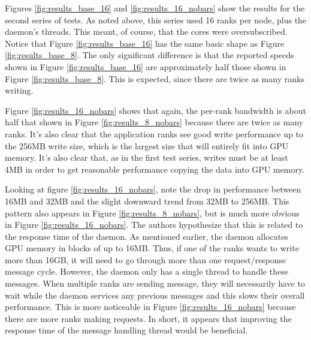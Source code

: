 
Figures \ref{fig:results_base_16} and \ref{fig:results_16_nobars} show the results for the second series of tests.  As noted above, this series used 16 ranks per node, plus the daemon's threads.  This meant, of course, that the cores were oversubscribed.  Notice that Figure \ref{fig:results_base_16} has the same basic shape as Figure \ref{fig:results_base_8}.  The only significant difference is that the reported speeds shown in Figure \ref{fig:results_base_16} are approximately half those shown in Figure \ref{fig:results_base_8}.  This is expected, since there are twice as many ranks writing.

Figure \ref{fig:results_16_nobars} shows that again, the per-rank bandwidth is about half that shown in Figure \ref{fig:results_8_nobars} because there are twice as many ranks.  It's also clear that the application ranks see good write performance up to the 256MB write size, which is the largest size that will entirely fit into GPU memory.  It's also clear that, as in the first test series, writes must be at least 4MB in order to get reasonable performance copying the data into GPU memory.


Looking at figure \ref{fig:results_16_nobars}, note the drop in performance between 16MB and 32MB and the slight downward trend from 32MB to 256MB.  This pattern also appears in Figure \ref{fig:results_8_nobars}, but is much more obvious in Figure 
\ref{fig:results_16_nobars}.  The authors hypothesize that this is related to the response time of the daemon.  As mentioned earlier, the daemon allocates GPU memory in blocks of up to 16MB.  Thus, if one of the ranks wants to write more than 16GB, it will need to go through more than one request/response message cycle.  However, the daemon only has a single thread to handle these messages.  When multiple ranks are sending message, they will necessarily have to wait while the daemon services any previous messages and this slows their overall performance.  This is more noticeable in Figure 
\ref{fig:results_16_nobars} because there are more ranks making requests.
In short, it appears that improving the response time of the message handling thread would be beneficial.

